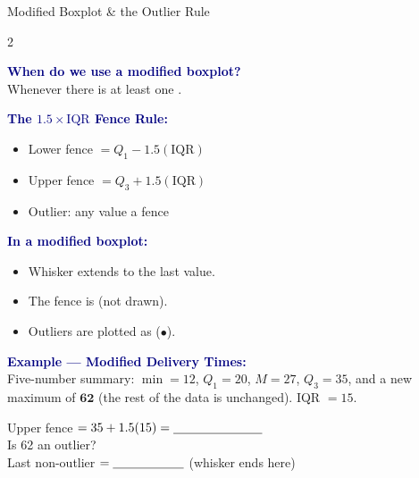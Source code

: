 \documentclass[10pt]{article}
\begin{document}
\vspace{0.08in}

\boxguard
\begin{notesbox}{Modified Boxplot \& the Outlier Rule}
\small
\begin{multicols}{2}

\textbf{\textcolor{navy}{When do we use a modified boxplot?}}\\
Whenever there is at least one \blank{3cm}.

\vspace{6pt}
\textbf{\textcolor{navy}{The $1.5 \times \text{IQR}$ Fence Rule:}}
\begin{itemize}[itemsep=4pt]
  \item Lower fence $= Q_1 - 1.5(\text{IQR})$
  \item Upper fence $= Q_3 + 1.5(\text{IQR})$
  \item Outlier: any value \blank{3cm} a fence
\end{itemize}

\vspace{6pt}
\textbf{\textcolor{navy}{In a modified boxplot:}}
\begin{itemize}[itemsep=3pt]
  \item Whisker extends to the last \blank{2.5cm} value.
  \item The fence is \blank{2.5cm} (not drawn).
  \item Outliers are plotted as \blank{2cm} ($\bullet$).
\end{itemize}

\columnbreak

\textbf{\textcolor{navy}{Example --- Modified Delivery Times:}}\\[4pt]
Five-number summary: $\min=12$, $Q_1=20$, $M=27$, $Q_3=35$, and a
new maximum of $\mathbf{62}$ (the rest of the data is unchanged).
IQR $= 15$.

\vspace{4pt}
Upper fence $= 35 + 1.5(15) = \blank{2.5cm}$\\[3pt]
Is 62 an outlier? \blank{2cm}\\[3pt]
Last non-outlier $= \blank{2cm}$ (whisker ends here)


\end{multicols}
\end{notesbox}
\end{document}
